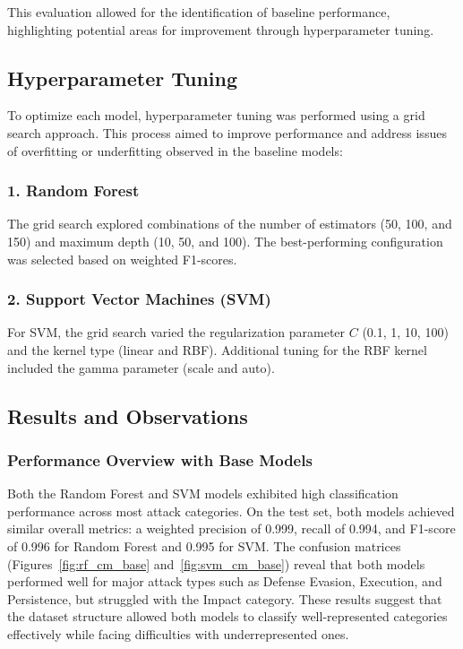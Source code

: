         This evaluation allowed for the identification of baseline performance, highlighting potential areas for improvement through hyperparameter tuning.

    \subsection{Hyperparameter Tuning}
    
        To optimize each model, hyperparameter tuning was performed using a grid search approach. This process aimed to improve performance and address issues of overfitting or underfitting observed in the baseline models:

        \subsubsection*{1. Random Forest \\}
        
            The grid search explored combinations of the number of estimators (50, 100, and 150) and maximum depth (10, 50, and 100). The best-performing configuration was selected based on weighted F1-scores.

        \subsubsection*{2. Support Vector Machines (SVM) \\}
        
            For SVM, the grid search varied the regularization parameter \( C \) (0.1, 1, 10, 100) and the kernel type (linear and RBF). Additional tuning for the RBF kernel included the gamma parameter (scale and auto).

            \subsection{Results and Observations}
            
            \subsubsection*{Performance Overview with Base Models\\}
            Both the Random Forest and SVM models exhibited high classification performance across most attack categories. On the test set, both models achieved similar overall metrics: a weighted precision of 0.999, recall of 0.994, and F1-score of 0.996 for Random Forest and 0.995 for SVM. The confusion matrices (Figures~\ref{fig:rf_cm_base} and~\ref{fig:svm_cm_base}) reveal that both models performed well for major attack types such as Defense Evasion, Execution, and Persistence, but struggled with the Impact category. These results suggest that the dataset structure allowed both models to classify well-represented categories effectively while facing difficulties with underrepresented ones.
            
